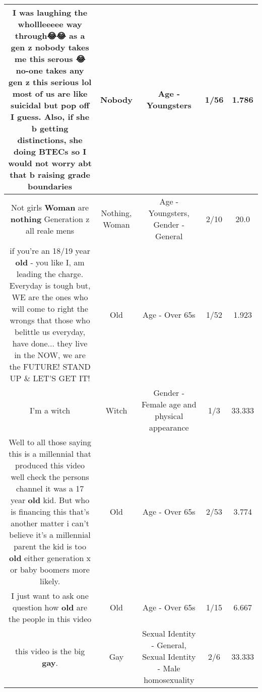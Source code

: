\documentclass[11pt]{article}
\newlength\mylength
\begin{document}
\begin{center}
\begin{longtable}{|C{.65\mylength}|C{.30\mylength}|C{.12\mylength}|C{.12\mylength}|C{.12\mylength}|}
  \small I was laughing the whollleeeee way through😂😂 as a gen z \textbf{nobody} takes me this serous 😂 no-one takes any gen z this serious lol most of us are like suicidal but pop off I guess. Also, if she b getting distinctions, she doing BTECs so I would not worry abt that b raising grade boundaries\normalsize   & Nobody & Age - Youngsters & 1/56 & 1.786 \\  \hline
  \small Not girls \textbf{Woman} are \textbf{nothing} Generation z all reale mens\normalsize   & Nothing, Woman & Age - Youngsters, Gender - General & 2/10 & 20.0 \\  \hline
  \small if you're an 18/19 year \textbf{old} - you like I, am leading the charge. Everyday is tough but, WE are the ones who will come to right the wrongs that those who belittle us everyday, have done... they live in the NOW, we are the FUTURE! STAND UP \& LET'S GET IT!\normalsize   & Old & Age - Over 65s & 1/52 & 1.923 \\  \hline
  \small I'm a witch\normalsize   & Witch & Gender - Female age and physical appearance & 1/3 & 33.333 \\  \hline
  \small Well to all those saying this is a millennial that produced this video well check the persons channel it was a 17 year \textbf{old} kid. But who is financing this that's another matter i can't believe it's a millennial parent the kid is too \textbf{old} either generation x or baby boomers more likely.\normalsize   & Old & Age - Over 65s & 2/53 & 3.774 \\  \hline
  \small I just want to ask one question how \textbf{old} are the people in this video\normalsize   & Old & Age - Over 65s & 1/15 & 6.667 \\  \hline
  \small this video is the big \textbf{g\textbf{ay}}.\normalsize   & Gay & Sexual Identity - General, Sexual Identity - Male homosexuality & 2/6 & 33.333 \\  \hline

\end{longtable}
\end{center}
\end{document}
